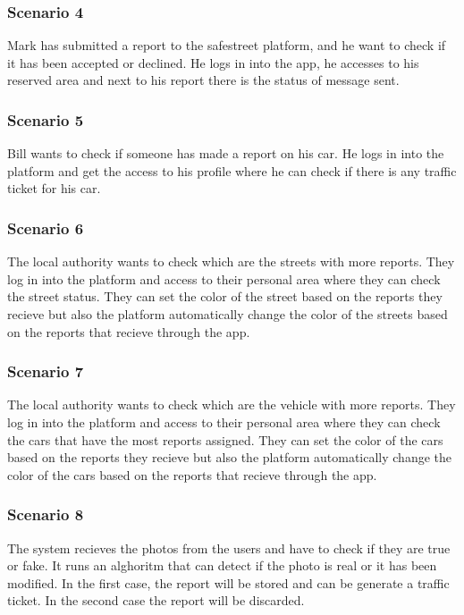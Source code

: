 \subsubsection{Scenario 4}
Mark has submitted a report to the safestreet platform, and he want to check if it has been accepted or declined.
He logs in into the app, he accesses to his reserved area and next to his report there is the status of message sent.

\subsubsection{Scenario 5}
Bill wants to check if someone has made a report on his car. He logs in into the platform and get the access to his profile where he can check if there is any traffic ticket for his car.

\subsubsection{Scenario 6}
The local authority wants to check which are the streets with more reports. They log in into the platform and access to their personal area where they can check the street status. They can set the color of the street based on the reports they recieve but also the platform automatically change the color of the streets based on the reports that recieve through the app.

 
\subsubsection{Scenario 7}
The local authority wants to check which are the vehicle with more reports. They log in into the platform and access to their personal area where they can check the cars that have the most reports assigned. They can set the color of the cars based on the reports they recieve but also the platform automatically change the color of the cars based on the reports that recieve through the app.

\subsubsection{Scenario 8}
The system recieves the photos from the users and have to check if they are true or fake. It runs an alghoritm that can detect if the photo is real or it has been modified. In the first case, the report will be stored and can be generate a traffic ticket. In the second case the report will be discarded.

